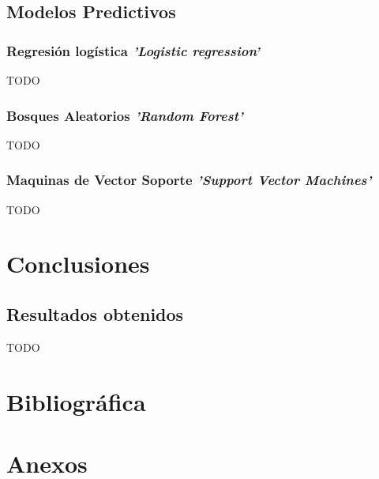 \documentclass[10pt,a4paper,oneside]{book}
\begin{document}
\newpage
\section{Modelos Predictivos}

\subsection{Regresión logística \textit{'Logistic regression'}}
TODO

\subsection{Bosques Aleatorios \textit{'Random Forest'}}
TODO

\subsection{Maquinas de Vector Soporte \textit{'Support Vector Machines'}}
TODO

\chapter{Conclusiones}

\section{Resultados obtenidos}
TODO

\chapter{Bibliográfica}

\cleardoublepage
{}
{}
\listoffigures

\chapter{Anexos}
\end{document}
